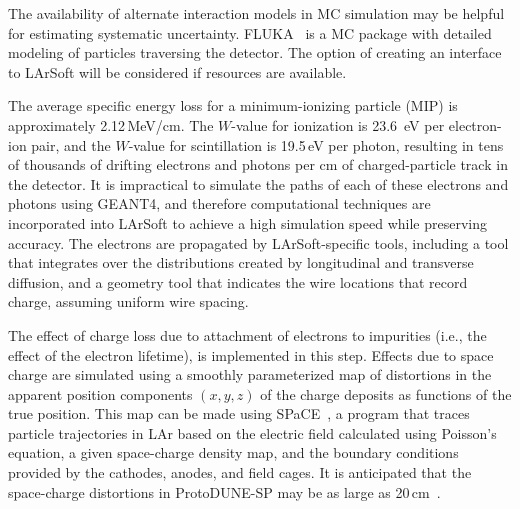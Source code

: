 The availability of alternate interaction models in MC simulation may be helpful for estimating systematic uncertainty.
FLUKA~\cite{Fluka15, Ferrari:2005zk, Battistoni:2009zzb} is a MC package with detailed modeling of particles traversing the detector. The option of creating an interface to LArSoft will be considered if resources are available. 


The average specific energy loss for a minimum-ionizing particle (MIP)
is approximately 2.12\,MeV/cm.  The $W$-value for ionization is 23.6~eV
per electron-ion pair, and the $W$-value for scintillation is 19.5\,eV
per photon, resulting in tens of thousands of drifting electrons and
photons per cm of charged-particle track in the detector.  It is
impractical to simulate the paths of each of these electrons and 
photons using GEANT4, and therefore computational techniques are incorporated
into LArSoft to achieve a high simulation speed while preserving
accuracy.  The electrons are propagated by LArSoft-specific tools,
including a tool that integrates over the distributions created by longitudinal
and transverse diffusion, 
and a geometry tool that indicates the wire locations that record charge, assuming uniform wire spacing.

The effect of charge loss due to attachment
of electrons to impurities (i.e., the effect of the electron lifetime),  is
implemented in this step.  
Effects due to space charge are simulated using a smoothly parameterized
map of
distortions in the apparent position components $(x,y,z)$ of the charge
deposits as
functions of the true position.
This map can be made using SPaCE~\cite{Mooney:2015kke}, a
program that traces particle trajectories in LAr based on the
electric field calculated using Poisson's equation, a given
space-charge density map, and the boundary conditions provided by the
cathodes, anodes, and field cages.  It is anticipated that the
space-charge distortions in ProtoDUNE-SP may be as large as
20\,cm~\cite{Mooney:2015kke}. 


